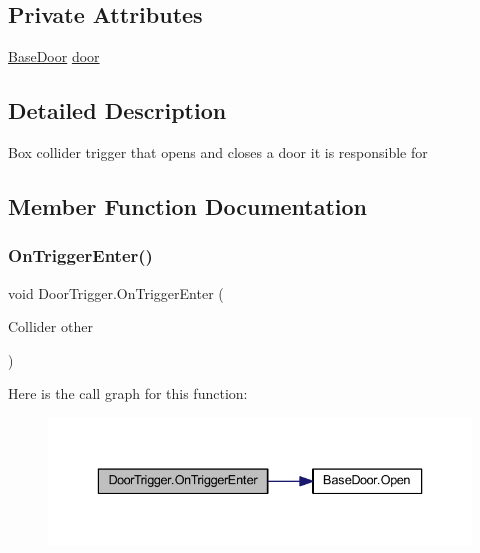 \subsection*{Private Attributes}
\begin{DoxyCompactItemize}
\item 
\mbox{\hyperlink{class_base_door}{Base\+Door}} \mbox{\hyperlink{class_door_trigger_a592b30ac7c1c4b719d6a90fa96fbb046}{door}}
\end{DoxyCompactItemize}


\subsection{Detailed Description}
Box collider trigger that opens and closes a door it is responsible for 



\subsection{Member Function Documentation}
\mbox{\label{class_door_trigger_a9cad842a8527ec462aae682c8c50b118}} 
\subsubsection{\texorpdfstring{On\+Trigger\+Enter()}{OnTriggerEnter()}}
{\footnotesize\ttfamily void Door\+Trigger.\+On\+Trigger\+Enter (\begin{DoxyParamCaption}\item[{Collider}]{other }\end{DoxyParamCaption})\hspace{0.3cm}{\ttfamily [private]}}

Here is the call graph for this function\+:
\nopagebreak
\begin{figure}[H]
\begin{center}
\leavevmode
\includegraphics[width=336pt]{class_door_trigger_a9cad842a8527ec462aae682c8c50b118_cgraph}
\end{center}
\end{figure}
\mbox{\label{class_door_trigger_adee54426b691466c5d667b912816bb56}} 
